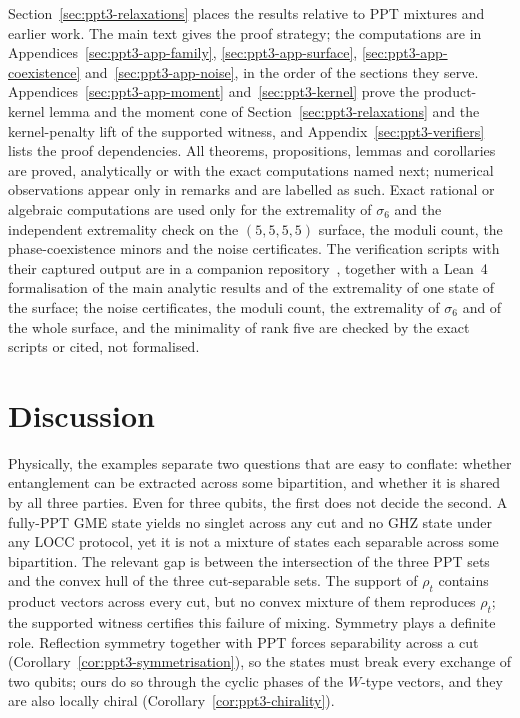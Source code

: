 \documentclass[11pt]{article}
\theoremstyle{remark}
\begin{document}
Section~\ref{sec:ppt3-relaxations} places the results relative to PPT mixtures and earlier work. The main
text gives the proof strategy; the computations are in Appendices~\ref{sec:ppt3-app-family}, \ref{sec:ppt3-app-surface},
\ref{sec:ppt3-app-coexistence} and~\ref{sec:ppt3-app-noise}, in the order of the sections they serve. Appendices~\ref{sec:ppt3-app-moment}
and~\ref{sec:ppt3-kernel} prove the product-kernel lemma and the moment cone of Section~\ref{sec:ppt3-relaxations} and the kernel-penalty
lift of the supported witness, and Appendix~\ref{sec:ppt3-verifiers} lists the proof dependencies. All theorems,
propositions, lemmas and corollaries are proved, analytically or with the exact computations named next; numerical
observations appear only in remarks and are labelled as such. Exact rational or algebraic
computations are used only for the extremality of $\sigma_6$ and the independent extremality check on the $(5,5,5,5)$ surface, the moduli count, the phase-coexistence minors and the noise certificates. The verification scripts with their
captured output are in a companion repository~\cite{Companion}, together with a Lean~4 formalisation of the main analytic
results and of the extremality of one state of the surface; the noise certificates, the moduli count, the extremality of
$\sigma_6$ and of the whole surface, and the minimality of rank five are checked by the exact scripts or cited, not formalised.








\section{Discussion}\label{sec:ppt3-discussion}

Physically, the examples separate two questions that are easy to conflate: whether entanglement can be extracted across
some bipartition, and whether it is shared by all three parties. Even for three qubits, the first does not decide the second. A
fully-PPT GME state yields no singlet across any cut and no GHZ state under any LOCC protocol, yet it is not a mixture of
states each separable across some bipartition. The relevant gap is between the intersection of the three PPT sets and
the convex hull of the three cut-separable sets. The support of $\rho_t$ contains product vectors across every cut, but no convex mixture of them
reproduces $\rho_t$; the supported witness certifies this failure of mixing. Symmetry plays a definite role.
Reflection symmetry together with PPT forces separability across a cut (Corollary~\ref{cor:ppt3-symmetrisation}), so the
states must break every exchange of two qubits; ours do so through the cyclic phases of the $W$-type vectors, and they
are also locally chiral (Corollary~\ref{cor:ppt3-chirality}).
\end{document}
